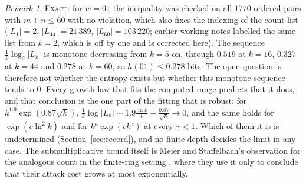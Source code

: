 \documentclass[11pt]{article}
\theoremstyle{definition}
\theoremstyle{remark}
\newtheorem{remark}[theorem]{Remark}
\newcommand{\EXACT}{\textsc{Exact}}
\begin{document}
\begin{remark}
\EXACT: for $w=01$ the inequality was checked on all $1770$ ordered pairs with $m+n\le60$ with no violation, which
also fixes the indexing of the count list ($|L_1|=2$, $|L_{44}|=21\,389$, $|L_{60}|=103\,220$; earlier
working notes labelled the same list from $k=2$, which is off by one and is corrected here). The sequence
$\frac1k\log_2|L_k|$ is monotone decreasing from $k=5$ on, through $0.519$ at $k=16$, $0.327$ at $k=44$ and
$0.278$ at $k=60$, so $h(01)\le0.278$ bits. The open question is therefore not whether the entropy exists
but whether this monotone sequence tends to $0$. Every growth law that fits the computed range predicts
that it does, and that conclusion is the one part of the fitting that is robust: for
$k^{1.9}\exp(0.87\sqrt k)$, $\frac1k\log|L_k|\sim1.9\frac{\ln k}{k}+\frac{0.87}{\sqrt k}\to0$, and the
same holds for $\exp(c\ln^2k)$ and for $k^{a}\exp(ck^{\gamma})$ at every $\gamma<1$. Which of them it is
is undetermined (Section~\ref{sec:record}), and no finite depth decides the limit in any case. The submultiplicative
bound itself is Meier and Staffelbach's observation for the analogous count in the finite-ring setting
\cite[eq.~(10)]{MS}, where they use it only to conclude that their attack cost grows at most exponentially.
\end{remark}
\end{document}

